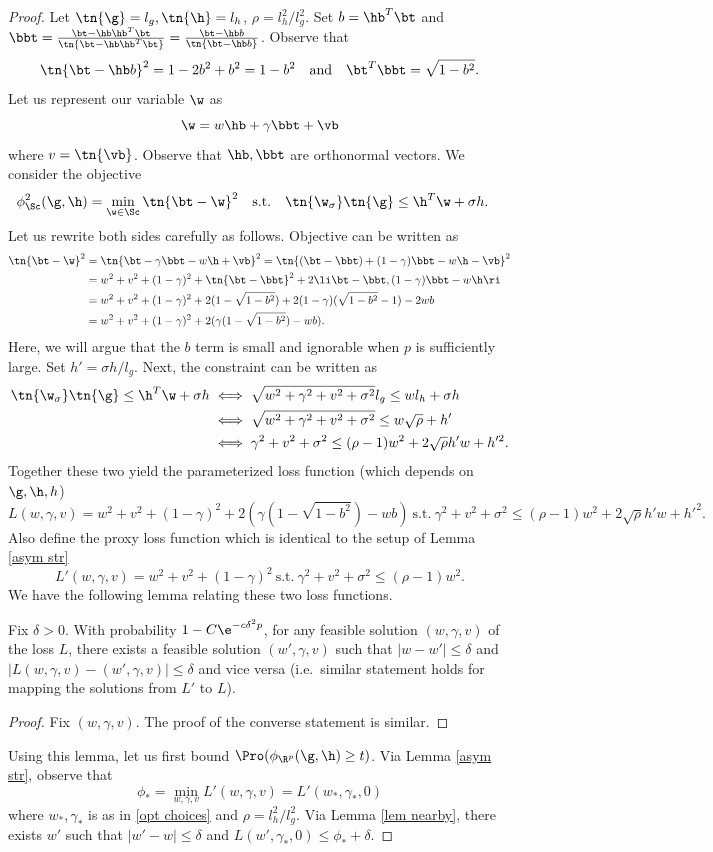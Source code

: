 \begin{proof}
Let $\tn{\g}=l_g,\tn{\h}=l_h$, $\rho=l_h^2/l_g^2$. Set $b=\hb^T\bt$ and $\bbt=\frac{\bt-\hb\hb^T\bt}{\tn{\bt-\hb\hb^T\bt}}=\frac{\bt-\hb b}{\tn{\bt-\hb b}}$. Observe that
\[
\tn{\bt-\hb b}^2=1-2b^2+b^2=1-b^2\quad\text{and}\quad \bt^T\bbt=\sqrt{1-b^2}.
\]
Let us represent our variable $\w$ as 
\[
\w=w\hb+\gamma\bbt+\vb
\]
where $v=\tn{\vb}$. Observe that $\hb,\bbt$ are orthonormal vectors. We consider the objective
\begin{align}
\phi_\Sc^2(\g,\h)&=\min_{\w\in\Sc}\tn{\bt-\w}^2\quad\text{s.t.}\quad \tn{\w_\sigma}\tn{\g}\leq \h^T\w+\sigma h.
\end{align}
Let us rewrite both sides carefully as follows. Objective can be written as
\begin{align}
\tn{\bt-\w}^2&=\tn{\bt-\gamma\bbt-w\h+\vb}^2=\tn{(\bt-\bbt)+(1-\gamma)\bbt-w\h-\vb}^2\\
&=w^2+v^2+(1-\gamma)^2+\tn{\bt-\bbt}^2+2\li \bt-\bbt,(1-\gamma)\bbt-w\h\ri\\
&=w^2+v^2+(1-\gamma)^2+2(1-\sqrt{1-b^2})+2(1-\gamma)(\sqrt{1-b^2}-1)-2wb\\
&=w^2+v^2+(1-\gamma)^2+2(\gamma (1-\sqrt{1-b^2})-wb).
\end{align}
Here, we will argue that the $b$ term is small and ignorable when $p$ is sufficiently large. Set $h'=\sigma h/l_g$. Next, the constraint can be written as
\begin{align}
\tn{\w_\sigma}\tn{\g}\leq \h^T\w+\sigma h&\iff \sqrt{w^2+\gamma^2+v^2+\sigma^2}l_g\leq wl_h+\sigma h\\
&\iff \sqrt{w^2+\gamma^2+v^2+\sigma^2}\leq w\sqrt{\rho}+h'\\
&\iff \gamma^2+v^2+\sigma^2\leq (\rho-1)w^2+2\sqrt{\rho}h'w+h'^2.
\end{align}
Together these two yield the parameterized loss function (which depends on $\g,\h,h$)
\[
L(w,\gamma,v)=w^2+v^2+(1-\gamma)^2+2(\gamma (1-\sqrt{1-b^2})-wb)~\text{s.t.}~\gamma^2+v^2+\sigma^2\leq (\rho-1)w^2+2\sqrt{\rho}h'w+h'^2.
\]
Also define the proxy loss function which is identical to the setup of Lemma \ref{asym str}
\[
L'(w,\gamma,v)=w^2+v^2+(1-\gamma)^2~\text{s.t.}~\gamma^2+v^2+\sigma^2\leq (\rho-1)w^2.
\]
We have the following lemma relating these two loss functions.
\begin{lemma} \label{lem nearby} Fix $\delta>0$. With probability $1-C\e^{-c\delta^2p}$, for any feasible solution $(w,\gamma,v)$ of the loss $L$, there exists a feasible solution $(w',\gamma,v)$ such that $|w-w'|\leq \delta$ and $|L(w,\gamma,v)-(w',\gamma,v)|\leq \delta$ and vice versa (i.e.~similar statement holds for mapping the solutions from $L'$ to $L$).
\end{lemma}
\begin{proof} Fix $(w,\gamma,v)$. The proof of the converse statement is similar.
\end{proof}
Using this lemma, let us first bound $\Pro(\phi_{\R^p}(\g,\h)\geq t)$. Via Lemma \ref{asym str}, observe that
\[
\phi_*=\min_{w,\gamma,v}L'(w,\gamma,v)=L'(w_*,\gamma_*,0)
\]
where $w_*,\gamma_*$ is as in \eqref{opt choices} and $\rho=l_h^2/l_g^2$. Via Lemma \ref{lem nearby}, there exists $w'$ such that $|w'-w| \leq\delta$ and $L(w',\gamma_*,0)\leq\phi_*+\delta$.
\end{proof}

